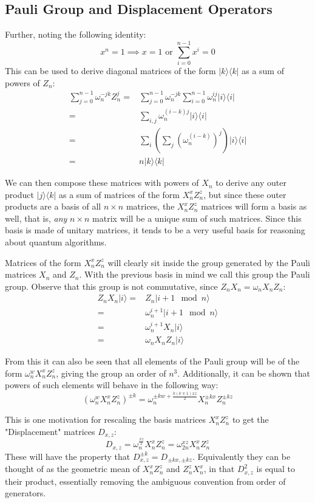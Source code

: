 \documentclass[]{article}
\newcommand{\bra}[1]{\langle #1 |}
\newcommand{\ket}[1]{| #1 \rangle}
\begin{document}
\subsection{Pauli Group and Displacement Operators}
 Further, noting the following identity:
\[x^n=1 \implies x = 1 \text{\ or\ } \sum_{i=0}^{n-1}x^i = 0\]
This can be used to derive diagonal matrices of the form $\ket{k}\bra{k}$ as a sum of powers of $Z_n$:
\begin{align*}
	\sum_{j=0}^{n-1} \omega_n^{-jk}Z_n^j
	=& \sum_{j=0}^{n-1}\omega_n^{-jk} \sum_{i=0}^{n-1}\omega_n^{ij}\ket{i}\bra{i}
	\\=& \sum_{i,j} \omega_n^{(i-k)j}\ket{i}\bra{i}
	\\=& \sum_{i} \left(\sum_j \left(\omega_n^{(i-k)}\right)^j\right)\ket{i}\bra{i}
	\\=& n\ket{k}\bra{k}
\end{align*}

We can then compose these matrices with powers of $X_n$ to derive any outer product $\ket{j}\bra{k}$ as a sum of matrices of the form $X_n^xZ_n^z$, but since these outer products are a basis of all $n\times n$ matrices, the $X_n^xZ_n^z$ matrices will form a basis as well, that is, \textit{any} $n\times n$ matrix will be a unique sum of such matrices. Since this basis is made of unitary matrices, it tends to be a very useful basis for reasoning about quantum algorithms.


Matrices of the form $X_n^xZ_n^z$ will clearly sit inside the group generated by the Pauli matrices $X_n$ and $Z_n$. With the previous basis in mind we call this group the Pauli group. Observe that this group is not commutative, since $Z_nX_n = \omega_nX_nZ_n$:
\begin{align*}
	Z_nX_n\ket{i}
	=& Z_n\ket{i+1\mod n}
	\\=& \omega_n^{i+1}\ket{i+1\mod n}
	\\=& \omega_n^{i+1}X_n\ket{i}
	\\=& \omega_nX_nZ_n\ket{i}
\end{align*}

From this it can also be seen that all elements of the Pauli group will be of the form $\omega_n^wX_n^xZ_n^z$, giving the group an order of $n^3$. Additionally, it can be shown that powers of such elements will behave in the following way:
\[(\omega_n^wX_n^xZ_n^z)^{\pm k} = \omega_n^{\pm kw+\frac{k(k \mp 1)xz}{2}}X_n^{\pm kx}Z_n^{\pm kz}\]

This is one motivation for rescaling the basis matrices $X_n^xZ_n^z$ to get the "Displacement" matrices $D_{x,z}$:
\[D_{x, z} = \omega_n^{\frac{xz}{2}}X_n^xZ_n^z = \omega_{2n}^{xz}X_n^xZ_n^z\]
These will have the property that $D_{x, z}^{\pm k} = D_{\pm kx, \pm kz}$. Equivalently they can be thought of as the geometric mean of $X_n^xZ_n^z$ and $Z_n^zX_n^x$, in that $D_{x,z}^2$ is equal to their product, essentially removing the ambiguous convention from order of generators.
\end{document}
